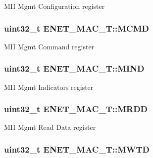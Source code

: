 M\-I\-I Mgmt Configuration register \hypertarget{structENET__MAC__T_af5015dd00c915a85f7aa387444349f59}{
\subsubsection[{M\-C\-M\-D}]{ uint32\-\_\-t E\-N\-E\-T\-\_\-\-M\-A\-C\-\_\-\-T\-::\-M\-C\-M\-D}}\label{structENET__MAC__T_af5015dd00c915a85f7aa387444349f59}
M\-I\-I Mgmt Command register \hypertarget{structENET__MAC__T_a6d107736b77b59d7188fb6faa04ea549}{
\subsubsection[{M\-I\-N\-D}]{ uint32\-\_\-t E\-N\-E\-T\-\_\-\-M\-A\-C\-\_\-\-T\-::\-M\-I\-N\-D}}\label{structENET__MAC__T_a6d107736b77b59d7188fb6faa04ea549}
M\-I\-I Mgmt Indicators register \hypertarget{structENET__MAC__T_a98a3f303ec4276150d3d4b8586f2a71d}{
\subsubsection[{M\-R\-D\-D}]{ uint32\-\_\-t E\-N\-E\-T\-\_\-\-M\-A\-C\-\_\-\-T\-::\-M\-R\-D\-D}}\label{structENET__MAC__T_a98a3f303ec4276150d3d4b8586f2a71d}
M\-I\-I Mgmt Read Data register \hypertarget{structENET__MAC__T_a588ac0beb769e9cabb7039582625a3e0}{
\subsubsection[{M\-W\-T\-D}]{ uint32\-\_\-t E\-N\-E\-T\-\_\-\-M\-A\-C\-\_\-\-T\-::\-M\-W\-T\-D}}\label{structENET__MAC__T_a588ac0beb769e9cabb7039582625a3e0}
